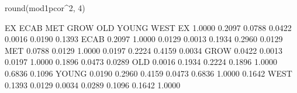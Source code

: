 \begin{Schunk}
\begin{Sinput}
 round(mod1pcor^2, 4)
\end{Sinput}
\begin{Soutput}
          EX   ECAB    MET   GROW    OLD  YOUNG   WEST
EX    1.0000 0.2097 0.0788 0.0422 0.0016 0.0190 0.1393
ECAB  0.2097 1.0000 0.0129 0.0013 0.1934 0.2960 0.0129
MET   0.0788 0.0129 1.0000 0.0197 0.2224 0.4159 0.0034
GROW  0.0422 0.0013 0.0197 1.0000 0.1896 0.0473 0.0289
OLD   0.0016 0.1934 0.2224 0.1896 1.0000 0.6836 0.1096
YOUNG 0.0190 0.2960 0.4159 0.0473 0.6836 1.0000 0.1642
WEST  0.1393 0.0129 0.0034 0.0289 0.1096 0.1642 1.0000
\end{Soutput}
\end{Schunk}
